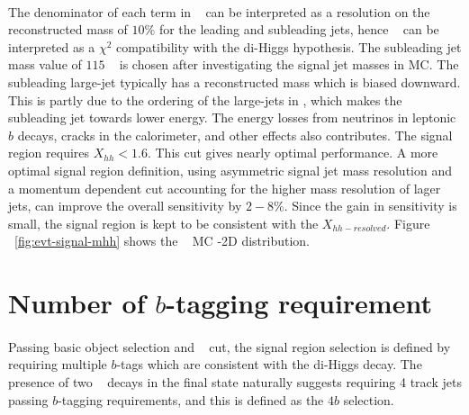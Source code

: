 \paragraph{}
The denominator of each term in \Xhh~ can be interpreted as a resolution on the reconstructed mass of $10\%$ for the leading and subleading jets, hence \Xhh~ can be interpreted as a $\chi^2$ compatibility with the di-Higgs hypothesis.
The subleading jet mass value of $115$ \GeV~ is chosen after investigating the signal jet masses in MC. 
The subleading large-\R jet typically has a reconstructed mass which is biased downward. 
This is partly due to the ordering of the large-\R jets in \pt, which makes the subleading jet towards lower energy. 
The energy losses from neutrinos in leptonic $b$ decays, cracks in the calorimeter, and other effects also contributes. 
The signal region requires $X_{hh} < 1.6$. 
This cut gives nearly optimal performance. 
A more optimal signal region definition, using asymmetric signal jet mass resolution and a momentum dependent cut accounting for the higher mass resolution of lager \pt~ jets, can improve the overall sensitivity by $2-8\%$.
Since the gain in sensitivity is small, the signal region is kept to be consistent with the $X_{hh-resolved}$. Figure ~\ref{fig:evt-signal-mhh} shows the \Grav~ MC \mlead-\msubl 2D distribution.


\section{Number of $b$-tagging requirement}
\paragraph{}
Passing basic object selection and \Xhh~ cut, the signal region selection is defined by requiring multiple $b$-tags which are consistent with the di-Higgs decay. 
The presence of two \hbb~ decays in the final state naturally suggests requiring 4 track jets passing $b$-tagging requirements, and this is defined as the  $4b$ selection.

